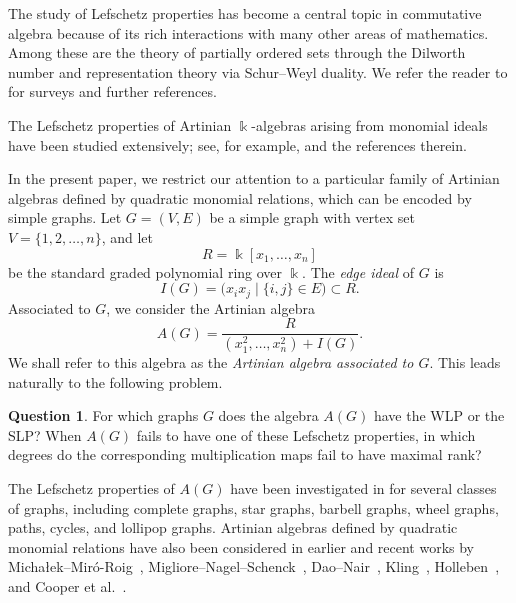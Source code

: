 \documentclass[12pt,twoside]{amsart}
\theoremstyle{definition}
\newtheorem{question}[thm]{Question}
\theoremstyle{mystyle}
\begin{document}
The study of Lefschetz properties has become a central topic in commutative algebra because of its rich interactions with many other areas of mathematics. Among these are the theory of partially ordered sets through the Dilworth number and representation theory via Schur--Weyl duality. We refer the reader to \cite{HMMNWW13,MN13} for surveys and further references.

The Lefschetz properties of Artinian \(\Bbbk\)-algebras arising from monomial ideals have been studied extensively; see, for example,
\cite{AB20,AN20,DN24,GLN22,H24,K25, MMO13,MM16,MNS20,MMN11,PT23}
and the references therein.

In the present paper, we restrict our attention to a particular family of Artinian algebras defined by quadratic monomial relations, which can be encoded by simple graphs. Let \(G=(V,E)\) be a simple graph with vertex set
\(V=\{1,2,\ldots,n\}\), and let
\[
R=\Bbbk[x_1,\ldots,x_n]
\]
be the standard graded polynomial ring over \(\Bbbk\). The \emph{edge ideal} of \(G\) is
\[
I(G)=\bigl(x_i x_j \mid \{i,j\}\in E\bigr)\subset R.
\]
Associated to \(G\), we consider the Artinian algebra
\[
A(G)=\frac{R}{(x_1^2,\ldots,x_n^2)+I(G)}.
\]
We shall refer to this algebra as the \emph{Artinian algebra associated to \(G\)}. This leads naturally to the following problem.

\begin{question}
	\label{quest_WLPofAG}
	For which graphs \(G\) does the algebra \(A(G)\) have the WLP or the SLP? When \(A(G)\) fails to have one of these Lefschetz properties, in which degrees do the corresponding multiplication maps fail to have maximal rank?
\end{question}
The Lefschetz properties of $A(G)$ have been investigated in \cite{HPS26,NT24b,T21} for several classes of graphs, including complete graphs, star graphs, barbell graphs, wheel graphs, paths, cycles, and lollipop graphs. Artinian algebras defined by quadratic monomial relations have also been considered in earlier and recent works by Michałek--Miró-Roig~\cite{MM16}, Migliore--Nagel--Schenck~\cite{MNS20}, Dao--Nair~\cite{DN24}, Kling~\cite{K24}, Holleben~\cite{H24,H25}, and Cooper et al.~\cite{CFHNVT24}.
\end{document}
